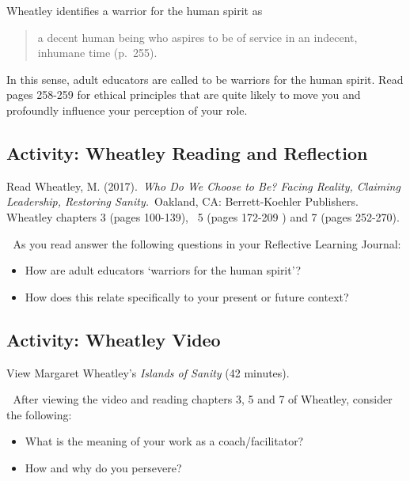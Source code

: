 \documentclass[
]{book}
\providecommand{\tightlist}{%
  \setlength{\itemsep}{0pt}\setlength{\parskip}{0pt}}
\begin{document}
Wheatley identifies a warrior for the human spirit as

\begin{quote}
a decent human being who aspires to be of service in an indecent, inhumane time (p.~255).
\end{quote}

In this sense, adult educators are called to be warriors for the human spirit. Read pages 258-259 for ethical principles that are quite likely to move you and profoundly influence your perception of your role.

\hypertarget{activity-wheatley-reading-and-reflection-1}{%
\subsection{Activity: Wheatley Reading and Reflection}\label{activity-wheatley-reading-and-reflection-1}}

\begin{reflect}
Read Wheatley, M. (2017).~\emph{Who Do We Choose to Be? Facing Reality,
Claiming Leadership, Restoring Sanity.}~Oakland, CA: Berrett-Koehler
Publishers. Wheatley chapters 3 (pages 100-139), ~5 (pages 172-209 ) and
7 (pages 252-270).

💭 As you read answer the following questions in your Reflective
Learning Journal:

\begin{itemize}
\tightlist
\item
  How are adult educators `warriors for the human spirit'?
\item
  How does this relate specifically to your present or future context?
\end{itemize}
\end{reflect}

\hypertarget{activity-wheatley-video}{%
\subsection{Activity: Wheatley Video}\label{activity-wheatley-video}}

\begin{video}
View Margaret Wheatley's \emph{Islands of Sanity} (42 minutes).

💭 After viewing the video and reading chapters 3, 5 and 7 of Wheatley,
consider the following:

\begin{itemize}
\tightlist
\item
  What is the meaning of your work as a coach/facilitator?
\item
  How and why do you persevere?
\end{itemize}
\end{video}
\end{document}
